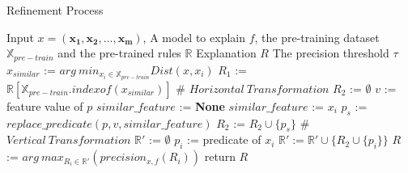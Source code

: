 \begin{algorithm}[tb]
   \caption{Refinement Process}
   \label{alg:refine}
    \begin{algorithmic}[1]
        Input $x=\boldsymbol{( x_1,x_2,...,x_m)}$, A model to explain $f$, the pre-training dataset $\mathbb{X}_{pre-train}$ and the pre-trained rules $\mathbb{R}$
        Explanation $R$
        The precision threshold $\tau$ %
       \STATE $x_{similar}$ := $arg\ min_{x_i \in \mathbb{X}_{pre-train}}Dist(x, x_i)$
       \STATE $R_1$ := $\mathbb{R}[\mathbb{X}_{pre-train}.indexof(x_{similar})]$
       \STATE \# $Horizontal\ Transformation$
       \STATE $R_2$ := $\emptyset$
            \STATE $v$ := feature value of $p$ 
            \STATE $similar\_feature$ := \textbf{None}
                        \STATE $similar\_feature$ := $x_i$
                    \ENDIF
            \ENDFOR
            \STATE $p_s$ := $replace\_predicate(p, v,similar\_feature)$
            \STATE $R_2$ := $R_2\cup \{p_s\}$
       \ENDFOR
       \STATE \# $Vertical\ Transformation$
        \REPEAT
        \STATE $\mathbb{R'} $ := $\emptyset$
            \STATE $p_{i}$ := predicate of $x_i$
                \STATE $\mathbb{R'} := \mathbb{R'}\cup\{R_2\cup\{p_{i}\}\}$
            \ENDIF
        \ENDFOR
        \STATE $R$ := $arg\ max_{R_i\in \mathbb{R}'}(precision_{x,f}(R_i))$
        \STATE return {$R$}
    \end{algorithmic}
\end{algorithm}


